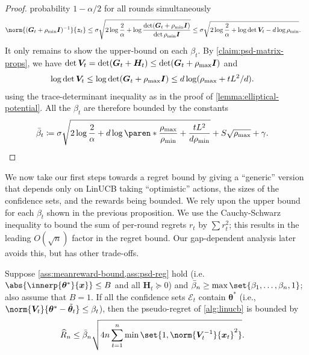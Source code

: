 \documentclass{article}
\renewcommand{\vec}[1]{\bm{#1}}
\newcommand{\defeq}{\coloneq}
\newcommand{\inv}[1]{#1^{-1}}
\renewcommand{\det}{\operatorname{det}}
\DeclarePairedDelimiter{\abs}||
\DeclarePairedDelimiter{\paren}()
\newcommand{\E}{\mathcal{E}}
\newcommand{\Eye}[1][]{\bm{I}\notblank{#1}{_{{#1}\times{#1}}}{}}
\begin{document}
\begin{proof}
  probability $1-\alpha/2$ for all rounds simultaneously
  \begin{align*}
    \norm{\inv{(\vec G_t + \rho_{\min}\Eye)}}{\vec z_t}
    &\le \sigma\sqrt{2\log\frac{2}{\alpha} + \log\frac{\det(\vec G_t+\rho_{\min}\Eye)}{\det\rho_{\min}\Eye}}
      \le \sigma\sqrt{2\log\frac{2}{\alpha} + \log\det \vec V_t - d\log\rho_{\min}}.
  \end{align*}
  It only remains to show the upper-bound on each $\beta_t$.  By
  \cref{claim:psd-matrix-props}, we have
  $\det \vec V_t = \det(\vec G_t+\vec H_t) \le \det(\vec G_t+\rho_{\max}\Eye)$ and
  \begin{align*}
    \log\det \vec V_t
    &\le \log\det(\vec G_t + \rho_{\max}\Eye)
    \le d\log(\rho_{\max} + tL^2/d).
  \end{align*}
  using the trace-determinant inequality as in the proof of
  \cref{lemma:elliptical-potential}.  All the $\beta_t$ are therefore
  bounded by the constants
  \begin{align*}
    \bar\beta_t &\defeq \sigma\sqrt{2\log\frac{2}{\alpha} + d\log\paren*{\frac{\rho_{\max}}{\rho_{\min}}
                 + \frac{tL^2}{d\rho_{\min}}}} + S\sqrt{\rho_{\max}} + \gamma. \qedhere
  \end{align*}
\end{proof}

We now take our first steps towards a regret bound by giving a
``generic'' version that depends only on LinUCB taking ``optimistic''
actions, the sizes of the confidence sets, and the rewards being
bounded.  We rely upon the upper bound for each $\beta_t$ shown in the
previous proposition.  We use the Cauchy-Schwarz inequality to bound
the sum of per-round regrets $r_t$ by $\sum r_t^2$; this results in
the leading $O(\sqrt n)$ factor in the regret bound.  Our
gap-dependent analysis later avoids this, but has other trade-offs.

\begin{lemma}\label{lemma:linucb-regret}
  Suppose \cref{ass:meanreward-bound,ass:psd-reg} hold (i.e.\
  $\abs{\innerp{\vec\theta^*}{\vec x}} \le B$ and all $\vec H_t \succeq 0$)
  and $\bar\beta_n \ge \max\set{\beta_1,\dotsc,\beta_n,1}$; also assume
  that $B = 1$.  If all
  the confidence sets $\E_t$ contain $\vec\theta^*$ (i.e.,
  $\norm{\vec V_t}{\vec\theta^* - \tilde{\vec\theta}_t} \le
  \beta_t$), then the pseudo-regret of \cref{alg:linucb} is bounded by
  \begin{align*}
    \widehat{R}_n &\le \bar\beta_n\sqrt{4n \sum_{t=1}^n \min\set{1,
                   \norm{\inv{\vec V_t}}{\vec x_t}^2}}.
  \end{align*}
\end{lemma}
\end{document}
